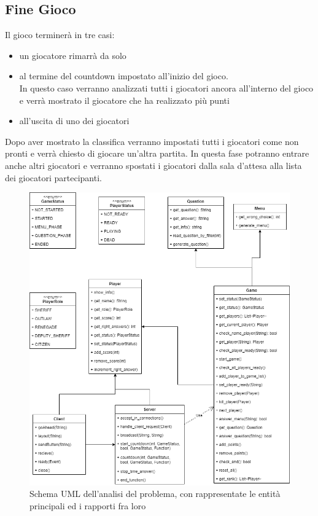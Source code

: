 \documentclass[a4paper,12pt]{report}
\begin{document}
\subsection{Fine Gioco}
Il gioco terminerà in tre casi:
\begin{itemize}
	\item un giocatore rimarrà da solo 
	\item al termine del countdown impostato all'inizio del gioco.\\ In questo caso verranno analizzati tutti i giocatori ancora all'interno del gioco e verrà mostrato il giocatore che ha realizzato più punti
	\item all'uscita di uno dei giocatori
\end{itemize}
Dopo aver mostrato la classifica verranno impostati tutti i giocatori come non pronti e verrà chiesto di giocare un'altra partita. In questa fase potranno entrare anche altri giocatori e verranno spostati i giocatori dalla sala d'attesa alla lista dei giocatori partecipanti.\clearpage

\begin{figure}[h]
\includegraphics[width=\textwidth,height=\textheight,keepaspectratio]{img/uml.jpg}
\caption{Schema UML dell'analisi del problema, con rappresentate le entità principali ed i rapporti fra loro}
\end{figure}
\end{document}
